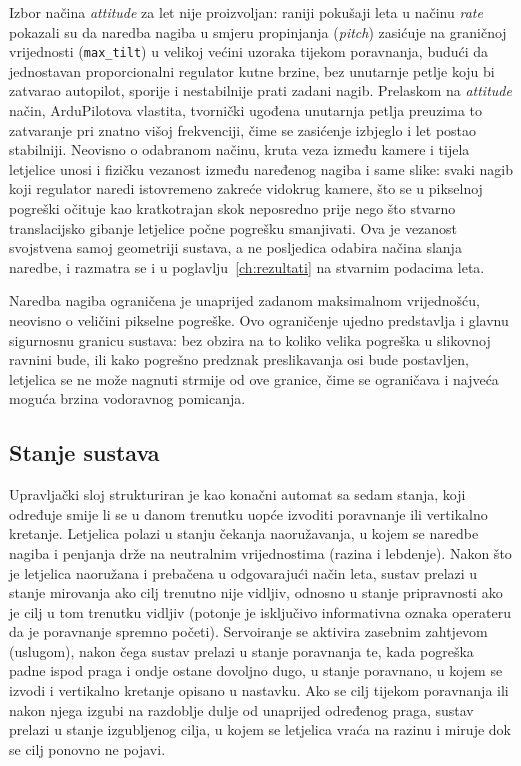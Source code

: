Izbor načina \emph{attitude} za let nije proizvoljan: raniji pokušaji leta u načinu \emph{rate} pokazali su da naredba nagiba u smjeru propinjanja (\emph{pitch}) zasićuje na graničnoj vrijednosti (\texttt{max\_tilt}) u velikoj većini uzoraka tijekom poravnanja, budući da jednostavan proporcionalni regulator kutne brzine, bez unutarnje petlje koju bi zatvarao autopilot, sporije i nestabilnije prati zadani nagib. Prelaskom na \emph{attitude} način, ArduPilotova vlastita, tvornički ugođena unutarnja petlja preuzima to zatvaranje pri znatno višoj frekvenciji, čime se zasićenje izbjeglo i let postao stabilniji. Neovisno o odabranom načinu, kruta veza između kamere i tijela letjelice unosi i fizičku vezanost između naređenog nagiba i same slike: svaki nagib koji regulator naredi istovremeno zakreće vidokrug kamere, što se u pikselnoj pogreški očituje kao kratkotrajan skok neposredno prije nego što stvarno translacijsko gibanje letjelice počne pogrešku smanjivati. Ova je vezanost svojstvena samoj geometriji sustava, a ne posljedica odabira načina slanja naredbe, i razmatra se i u poglavlju~\ref{ch:rezultati} na stvarnim podacima leta.

Naredba nagiba ograničena je unaprijed zadanom maksimalnom vrijednošću, neovisno o veličini pikselne pogreške. Ovo ograničenje ujedno predstavlja i glavnu sigurnosnu granicu sustava: bez obzira na to koliko velika pogreška u slikovnoj ravnini bude, ili kako pogrešno predznak preslikavanja osi bude postavljen, letjelica se ne može nagnuti strmije od ove granice, čime se ograničava i najveća moguća brzina vodoravnog pomicanja.

\subsection{Stanje sustava}
\label{subsec:state-machine}

Upravljački sloj strukturiran je kao konačni automat sa sedam stanja, koji određuje smije li se u danom trenutku uopće izvoditi poravnanje ili vertikalno kretanje. Letjelica polazi u stanju čekanja naoružavanja, u kojem se naredbe nagiba i penjanja drže na neutralnim vrijednostima (razina i lebdenje). Nakon što je letjelica naoružana i prebačena u odgovarajući način leta, sustav prelazi u stanje mirovanja ako cilj trenutno nije vidljiv, odnosno u stanje pripravnosti ako je cilj u tom trenutku vidljiv (potonje je isključivo informativna oznaka operateru da je poravnanje spremno početi). Servoiranje se aktivira zasebnim zahtjevom (uslugom), nakon čega sustav prelazi u stanje poravnanja te, kada pogreška padne ispod praga i ondje ostane dovoljno dugo, u stanje poravnano, u kojem se izvodi i vertikalno kretanje opisano u nastavku. Ako se cilj tijekom poravnanja ili nakon njega izgubi na razdoblje dulje od unaprijed određenog praga, sustav prelazi u stanje izgubljenog cilja, u kojem se letjelica vraća na razinu i miruje dok se cilj ponovno ne pojavi.

